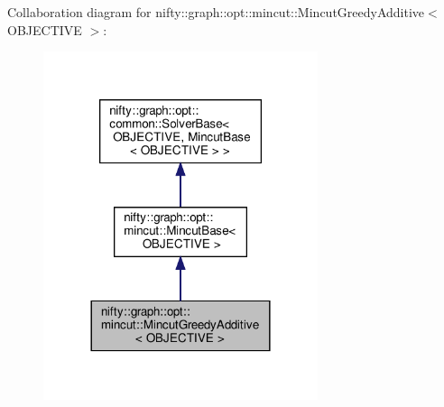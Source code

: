 Collaboration diagram for nifty\+:\+:graph\+:\+:opt\+:\+:mincut\+:\+:Mincut\+Greedy\+Additive$<$ O\+B\+J\+E\+C\+T\+I\+VE $>$\+:
\nopagebreak
\begin{figure}[H]
\begin{center}
\leavevmode
\includegraphics[width=228pt]{classnifty_1_1graph_1_1opt_1_1mincut_1_1MincutGreedyAdditive__coll__graph}
\end{center}
\end{figure}
